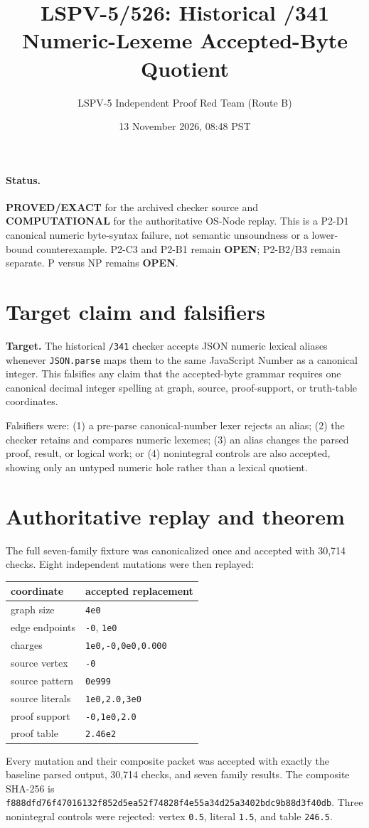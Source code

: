 \documentclass[11pt]{article}
\title{LSPV-5/526: Historical /341 Numeric-Lexeme Accepted-Byte Quotient}
\author{LSPV-5 Independent Proof Red Team (Route B)}
\date{13 November 2026, 08:48 PST}
\begin{document}
\maketitle

\paragraph{Status.} \textbf{PROVED/EXACT} for the archived checker source and
\textbf{COMPUTATIONAL} for the authoritative OS-Node replay. This is a P2-D1
canonical numeric byte-syntax failure, not semantic unsoundness or a lower-bound
counterexample. P2-C3 and P2-B1 remain \textbf{OPEN}; P2-B2/B3 remain separate.
P versus NP remains \textbf{OPEN}.

\section{Target claim and falsifiers}
\textbf{Target.} The historical \texttt{/341} checker accepts JSON numeric lexical aliases
whenever \texttt{JSON.parse} maps them to the same JavaScript Number as a canonical integer.
This falsifies any claim that the accepted-byte grammar requires one canonical decimal integer
spelling at graph, source, proof-support, or truth-table coordinates.

Falsifiers were: (1) a pre-parse canonical-number lexer rejects an alias; (2) the checker retains
and compares numeric lexemes; (3) an alias changes the parsed proof, result, or logical work; or
(4) nonintegral controls are also accepted, showing only an untyped numeric hole rather than a
lexical quotient.

\section{Authoritative replay and theorem}
The full seven-family fixture was canonicalized once and accepted with 30,714 checks. Eight
independent mutations were then replayed:
\begin{center}
\begin{tabular}{ll}\toprule
coordinate & accepted replacement\\\midrule
graph size & \texttt{4e0}\\
edge endpoints & \texttt{-0}, \texttt{1e0}\\
charges & \texttt{1e0,-0,0e0,0.000}\\
source vertex & \texttt{-0}\\
source pattern & \texttt{0e999}\\
source literals & \texttt{1e0,2.0,3e0}\\
proof support & \texttt{-0,1e0,2.0}\\
proof table & \texttt{2.46e2}\\\bottomrule
\end{tabular}
\end{center}
Every mutation and their composite packet was accepted with exactly the baseline parsed output,
30,714 checks, and seven family results. The composite SHA-256 is
\texttt{f888dfd76f47016132f852d5ea52f74828f4e55a34d25a3402bdc9b88d3f40db}.
Three nonintegral controls were rejected: vertex \texttt{0.5}, literal \texttt{1.5}, and table
\texttt{246.5}.
\end{document}
